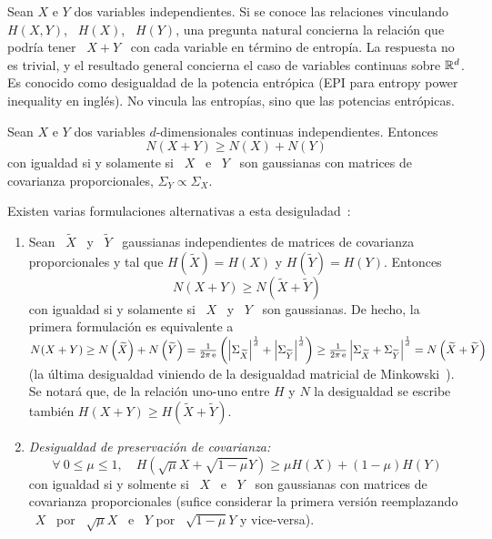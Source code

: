 

Sean  $X$ e  $Y$  dos variables  independientes.   Si se  conoce las  relaciones
vinculando \  $H(X,Y)$, \  $H(X)$, \ $H(Y)$,  una pregunta natural  concierna la
relaci\'on  que podr\'ia  tener \  $X+Y$  \ con  cada variable  en t\'ermino  de
entrop\'ia. La respuesta no es trivial, y el resultado general concierna el caso
de  variables continuas  sobre $\mathbb{R}^d$.   Es conocido  como desigualdad  de la
potencia entr\'opica (EPI para entropy power inequality en ingl\'es). No vincula
las entrop\'ias, sino que las potencias entr\'opicas.
%
\begin{teorema}\label{th:SZ:EPI}
  Sean  $X$  e $Y$  dos  variables  $d$-dimensionales continuas  independientes.
  Entonces
  \[
  N(X + Y) \ge N(X) + N(Y)
  \]
%
  con igualdad si y  solamente si \ $X$ \ e \ $Y$  \ son gaussianas con matrices
  de covarianza proporcionales, $\Sigma_Y \propto \Sigma_X$.
\end{teorema}
%
\noindent     Existen    varias     formulaciones     alternativas    a     esta
desiguladad~\cite{Sha48, Lie78, CovTho06, DemCov91, Rio07}:
%
\begin{enumerate}
\item\label{EPI:SZ:EquivGauss} Sean  \ $\widetilde{X}$  \ y \  $\widetilde{Y}$ \
  gaussianas independientes  de matrices de covarianza proporcionales  y tal que
  $H(\widetilde{X}) = H(X)$ y $H(\widetilde{Y}) = H(Y)$.  Entonces
  \[
  N(X+Y) \ge N\left( \widetilde{X} + \widetilde{Y} \right)
  \]
  con igualdad si y solamente si \ $X$  \ y \ $Y$ \ son gaussianas. De hecho, la
  primera  formulaci\'on  es equivalente  a  $N(X+Y)  \ge N\left(  \widetilde{X}
  \right) +  N\left( \widetilde{Y}  \right) = \frac{1}{2  \pi \operatorname{e}}  \left( \left|
      \Sigma_{\widetilde{X}}  \right|^{\frac1d} +  \left| \Sigma_{\widetilde{Y}}
    \right|^{\frac1d}     \right)    \ge     \frac{1}{2    \pi     \operatorname{e}}    \left|
    \Sigma_{\widetilde{X}} +  \Sigma_{\widetilde{Y}} \right|^{\frac1d} = N\left(
    \widetilde{X} + \widetilde{Y} \right)$  (la \'ultima desigualdad viniendo de
  la  desigualdad matricial de  Minkowski~\cite{HarLit52, Min10}).   Se notar\'a
  que,  de la  relaci\'on uno-uno  entre  $H$ y  $N$ la  desigualdad se  escribe
  tambi\'en $H(X+Y) \ge H\left( \widetilde{X} + \widetilde{Y} \right)$.
%
\item\label{EPI:SZ:PresCov}    {\it    Desigualdad    de    preservaci\'on    de
    covarianza:}
  \[
  \forall  \:   0  \le  \mu  \le   1,  \quad  H\left(   \sqrt{\mu}  X  +
    \sqrt{1-\mu} Y \right) \ge \mu H(X) + (1-\mu) H(Y)
  \]
  con igualdad si y solmente si \ $X$ \ e \ $Y$ \ son gaussianas con matrices de
  covarianza proporcionales (sufice considerar la primera versi\'on reemplazando
  \ $X$ \ por \ $\sqrt{\mu} X$ \ e \ $Y$ por \ $\sqrt{1-\mu} Y$ y vice-versa).
\end{enumerate}
%

